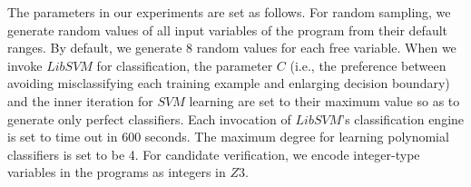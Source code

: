 The parameters in our experiments are set as follows. For random sampling, we generate random values of all input variables of the program from their default ranges. 
By default, we generate 8 random values for each free variable.
When we invoke $\mathit{LibSVM}$ for classification, the parameter $C$ (i.e., the preference between avoiding misclassifying each training example and enlarging decision boundary) 
and the inner iteration for $\mathit{SVM}$ learning are set to their maximum value so as to generate only perfect classifiers.
Each invocation of $\mathit{LibSVM}$'s classification engine is set to time out in 600 seconds.
The maximum degree for learning polynomial classifiers is set to be 4. 
For candidate verification, we encode integer-type variables in the programs as integers in $\mathit{Z3}$.
%
%

